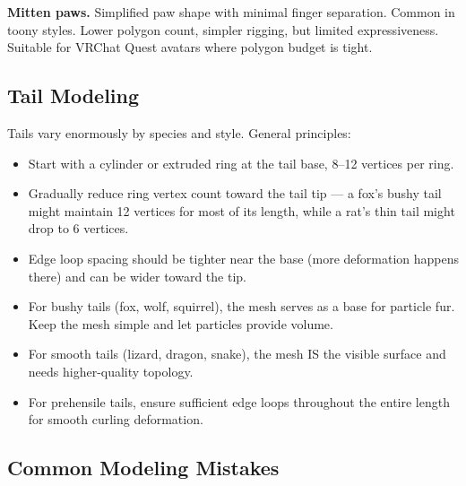 \textbf{Mitten paws.} Simplified paw shape with minimal finger separation. Common in toony styles. Lower polygon count, simpler rigging, but limited expressiveness. Suitable for VRChat Quest avatars where polygon budget is tight.


\subsection{Tail Modeling}

Tails vary enormously by species and style. General principles:

\begin{itemize}[leftmargin=2em]
  \item Start with a cylinder or extruded ring at the tail base, 8--12 vertices per ring.
  \item Gradually reduce ring vertex count toward the tail tip --- a fox's bushy tail might maintain 12 vertices for most of its length, while a rat's thin tail might drop to 6 vertices.
  \item Edge loop spacing should be tighter near the base (more deformation happens there) and can be wider toward the tip.
  \item For bushy tails (fox, wolf, squirrel), the mesh serves as a base for particle fur. Keep the mesh simple and let particles provide volume.
  \item For smooth tails (lizard, dragon, snake), the mesh IS the visible surface and needs higher-quality topology.
  \item For prehensile tails, ensure sufficient edge loops throughout the entire length for smooth curling deformation.
\end{itemize}


\subsection{Common Modeling Mistakes}

